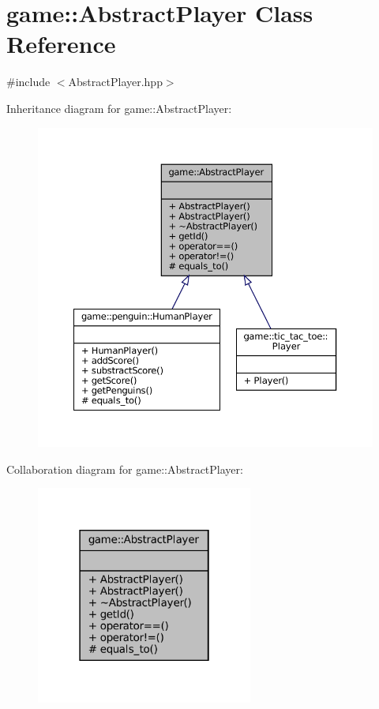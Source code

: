 \hypertarget{classgame_1_1_abstract_player}{}\section{game\+:\+:Abstract\+Player Class Reference}
\label{classgame_1_1_abstract_player}


{\ttfamily \#include $<$Abstract\+Player.\+hpp$>$}



Inheritance diagram for game\+:\+:Abstract\+Player\+:
\nopagebreak
\begin{figure}[H]
\begin{center}
\leavevmode
\includegraphics[width=350pt]{classgame_1_1_abstract_player__inherit__graph}
\end{center}
\end{figure}


Collaboration diagram for game\+:\+:Abstract\+Player\+:
\nopagebreak
\begin{figure}[H]
\begin{center}
\leavevmode
\includegraphics[width=202pt]{classgame_1_1_abstract_player__coll__graph}
\end{center}
\end{figure}
